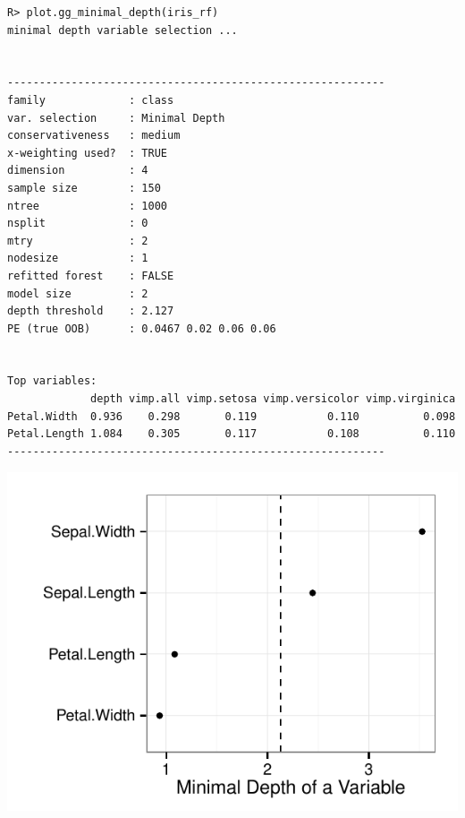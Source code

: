 \documentclass[nojss]{jss}\usepackage[]{graphicx}\usepackage[]{color}
\makeatletter
\def\maxwidth{ %
  \ifdim\Gin@nat@width>\linewidth
    \linewidth
  \else
    \Gin@nat@width
  \fi
}
\newenvironment{kframe}{%
 \def\at@end@of@kframe{}%
 \ifinner\ifhmode%
  \def\at@end@of@kframe{\end{minipage}}%
  \begin{minipage}{\columnwidth}%
 \fi\fi%
 \def\FrameCommand##1{\hskip\@totalleftmargin \hskip-\fboxsep
 \colorbox{shadecolor}{##1}\hskip-\fboxsep
     \hskip-\linewidth \hskip-\@totalleftmargin \hskip\columnwidth}%
 \MakeFramed {\advance\hsize-\width
   \@totalleftmargin\z@ \linewidth\hsize
   \@setminipage}}%
 {\par\unskip\endMakeFramed%
 \at@end@of@kframe}
\newenvironment{knitrout}{}{} %
\makeatother
\begin{document}
\begin{knitrout}\footnotesize
{}\color{fgcolor}\begin{kframe}
\begin{verbatim}
R> plot.gg_minimal_depth(iris_rf)
minimal depth variable selection ...


-----------------------------------------------------------
family             : class 
var. selection     : Minimal Depth 
conservativeness   : medium 
x-weighting used?  : TRUE 
dimension          : 4 
sample size        : 150 
ntree              : 1000 
nsplit             : 0 
mtry               : 2 
nodesize           : 1 
refitted forest    : FALSE 
model size         : 2 
depth threshold    : 2.127 
PE (true OOB)      : 0.0467 0.02 0.06 0.06 


Top variables:
             depth vimp.all vimp.setosa vimp.versicolor vimp.virginica
Petal.Width  0.936    0.298       0.119           0.110          0.098
Petal.Length 1.084    0.305       0.117           0.108          0.110
-----------------------------------------------------------
\end{verbatim}
\end{kframe}

{\centering \includegraphics[width=\maxwidth]{figure/beamer-iris-mindepth-1} 

}



\end{knitrout}
\end{document}
